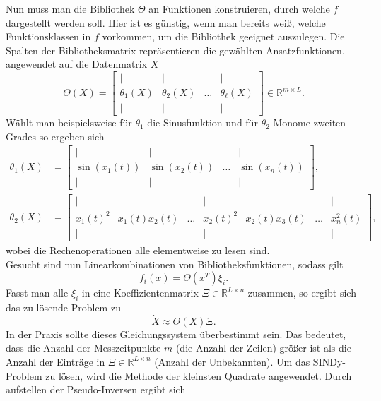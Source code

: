 \documentclass[arbeit=studie,oneside,BCOR=12mm]{ArbeitRST}
\begin{document}
Nun muss man die Bibliothek $\Theta$ an Funktionen konstruieren, durch welche $f$ dargestellt werden soll. Hier ist es günstig, wenn man bereits weiß, welche Funktionsklassen in $f$ vorkommen, um die Bibliothek geeignet auszulegen.
Die Spalten der Bibliotheksmatrix repräsentieren die gewählten Ansatzfunktionen, angewendet auf die Datenmatrix $X$ 
\begin{equation}
\Theta(X) = \begin{bmatrix}
		\mid & \mid & & \mid \\
		\theta_1(X) & \theta_2(X) & \dots & \theta_\ell(X) \\
		\mid & \mid & & \mid 
	\end{bmatrix}\in\mathbb{R}^{m\times L}.
\end{equation} 
Wählt man beispielsweise für $\theta_1$ die Sinusfunktion und für $\theta_2$ Monome zweiten Grades so ergeben sich 
\begin{align}
\theta_1(X) &= \begin{bmatrix}
		\mid 	  & \mid     		  &          & \mid             \\
		\sin(x_1(t)) & \sin(x_2(t))   & \dots    & \sin(x_n(t)) \\
		\mid      & \mid     		  &          & \mid              
	\end{bmatrix},\\
\theta_2(X) &= \begin{bmatrix}
		\mid & \mid & & \mid & \mid & & \mid \\
		x_1(t)^2 & x_1(t)x_2(t) & \dots & x_2(t)^2 & x_2(t)x_3(t) & \dots & x_n^2(t) \\
		\mid & \mid & & \mid & \mid & & \mid
	\end{bmatrix},	
\end{align}
wobei die Rechenoperationen alle elementweise zu lesen sind. \\
Gesucht sind nun Linearkombinationen von Bibliotheksfunktionen, sodass gilt
\begin{equation}
f_i(x) = \Theta(x^T)\xi_i.
\end{equation}
Fasst man alle $\xi_i$ in eine Koeffizientenmatrix $\Xi\in\mathbb{R}^{L\times n}$ zusammen, so ergibt sich das zu lösende Problem zu 
\begin{equation}
\dot{X} \approx \Theta(X)\Xi.
\end{equation}
\cite{Silva2020}
In der Praxis sollte dieses Gleichungssystem überbestimmt sein. Das bedeutet, dass die Anzahl der Messzeitpunkte $m$ (die Anzahl der Zeilen) größer ist als die Anzahl der Einträge in $\Xi\in\mathbb{R}^{L\times n}$ (Anzahl der Unbekannten). Um das SINDy-Problem zu lösen, wird die Methode der kleinsten Quadrate angewendet. Durch aufstellen der Pseudo-Inversen ergibt sich
\end{document}
